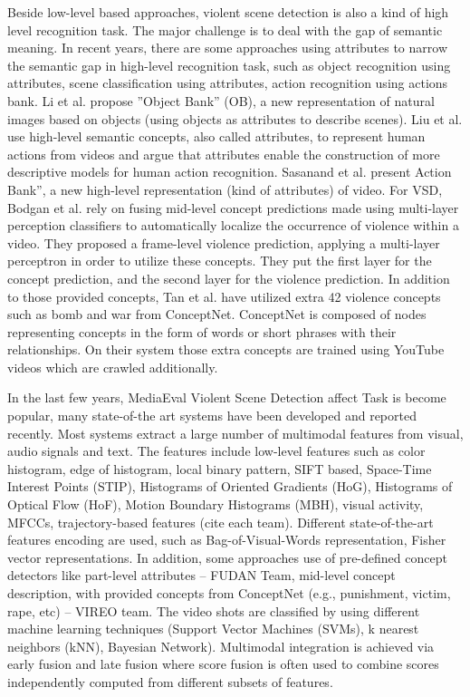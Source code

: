 \documentclass[review]{elsarticle}
\begin{document}
Beside low-level based approaches, violent scene detection is also a kind of high level recognition task. The major challenge is to deal with the gap of semantic meaning. In recent years, there are some approaches using attributes to narrow the semantic gap in high-level recognition task, such as object recognition using attributes, scene classification using attributes, action recognition using actions bank\cite{23}. Li et al.\cite{15} propose ”Object Bank” (OB), a new representation of natural images based on objects (using objects as attributes to describe scenes). Liu et al.\cite{18} use high-level semantic concepts, also called attributes, to represent human actions from videos and argue that attributes enable the construction of more descriptive models for human action recognition. Sasanand et al.\cite{23} present Action Bank”, a new high-level representation (kind of attributes) of video.  For VSD, Bodgan et al.\cite{13} rely on fusing mid-level concept predictions made using multi-layer perception classifiers to automatically localize the occurrence of violence within a video.  They proposed a frame-level violence prediction, applying a multi-layer perceptron in order to utilize these concepts. They put the first layer for the concept prediction, and the second layer for the violence prediction. In addition to those provided concepts, Tan et al.\cite{tan2013vireo} have utilized extra 42 violence concepts such as bomb and war from ConceptNet\cite{liu2004conceptnet}. ConceptNet is composed of nodes representing concepts in the form of words or short phrases with their relationships. On their system those extra concepts are trained using YouTube videos which are crawled additionally. 

In the last few years, MediaEval Violent Scene Detection affect Task is become popular, many state-of-the art systems have been developed and reported recently\cite{demarty2014benchmarking}. Most systems extract a large number of multimodal features from visual, audio signals and text.  The features include low-level features such as color histogram, edge of histogram, local binary pattern, SIFT based, Space-Time Interest Points (STIP), Histograms of Oriented Gradients (HoG), Histograms of Optical Flow (HoF), Motion Boundary Histograms (MBH), visual activity, MFCCs, trajectory-based features  (cite each team). Different state-of-the-art features encoding are used, such as Bag-of-Visual-Words representation, Fisher vector representations. In addition, some approaches use of pre-defined concept detectors like part-level attributes – FUDAN Team\cite{dai2013fudan}, mid-level concept description, with provided concepts from ConceptNet (e.g., punishment, victim, rape, etc) – VIREO team\cite{tan2013vireo}. The video shots are classified by using different machine learning techniques (Support Vector Machines (SVMs), k nearest neighbors (kNN), Bayesian Network). Multimodal integration is achieved via early fusion\cite{penet2013technicolor}  and late fusion\cite{penet2013technicolor,sjoberg2013far,derbas2013lig,dai2013fudan} where score fusion is often used to combine scores independently computed from different subsets of features.
\end{document}
